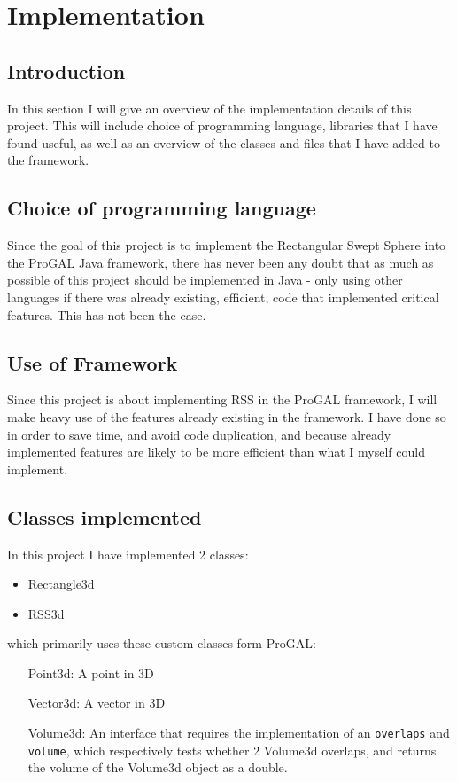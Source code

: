 
\section{Implementation}
\label{implementation}

\subsection{Introduction}
In this section I will give an overview of the implementation details of this project. This will include choice of programming language, libraries that I have found useful, as well as an overview of the classes and files that I have added to the framework.

\subsection{Choice of programming language}
Since the goal of this project is to implement the Rectangular Swept Sphere into the ProGAL Java framework, there has never been any doubt that as much as possible of this project should be implemented in Java - only using other languages if there was already existing, efficient, code that implemented critical features. This has not been the case.

\subsection{Use of Framework}
\label{framework}
Since this project is about implementing RSS in the ProGAL framework, I will make heavy use of the features already existing in the framework. I have done so in order to save time, and avoid code duplication, and because already implemented features are likely to be more efficient than what I myself could implement.

\subsection{Classes implemented}
In this project I have implemented 2 classes:
\begin{itemize}
\item Rectangle3d
\item RSS3d
\end{itemize}

which primarily uses these custom classes form ProGAL:

\begin{itemize}
\item[Point3d:] A point in 3D
\item[Vector3d:] A vector in 3D
\item[Volume3d:] An interface that requires the implementation of an \texttt{overlaps} and \texttt{volume}, which respectively tests whether 2 Volume3d overlaps, and returns the volume of the Volume3d object as a double.
\end{itemize}

